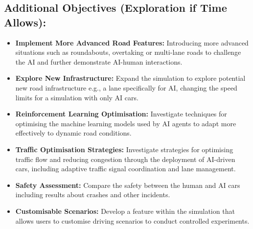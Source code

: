\documentclass{article}
\begin{document}
\subsection{Additional Objectives (Exploration if Time Allows):}

\begin{itemize}

\item \textbf{Implement More Advanced Road Features:} Introducing more advanced situations such as roundabouts, overtaking or multi-lane roads to challenge the AI and further demonstrate AI-human interactions.

\item \textbf{Explore New Infrastructure:} Expand the simulation to explore potential new road infrastructure e.g., a lane specifically for AI, changing the speed limits for a simulation with only AI cars.

\item \textbf{Reinforcement Learning Optimisation:} Investigate techniques for optimising the machine learning models used by AI agents to adapt more effectively to dynamic road conditions.

\item \textbf{Traffic Optimisation Strategies:} Investigate strategies for optimising traffic flow and reducing congestion through the deployment of AI-driven cars, including adaptive traffic signal coordination and lane management.

\item \textbf{Safety Assessment:} Compare the safety between the human and AI cars including results about crashes and other incidents.

\item \textbf{Customisable Scenarios:} Develop a feature within the simulation that allows users to customise driving scenarios to conduct controlled experiments.

\end{itemize}

\newpage


 
\end{document}
